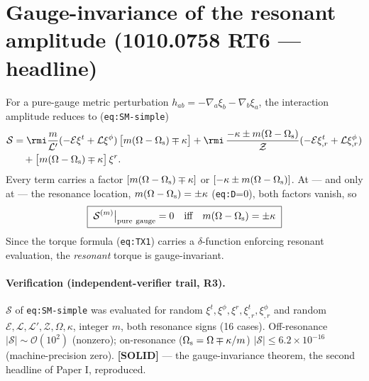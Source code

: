 \documentclass{article}
\begin{document}
\section*{Gauge-invariance of the resonant amplitude (1010.0758 RT6 — headline)}

For a pure-gauge metric perturbation $h_{ab}=-\nabla_a\xi_b-\nabla_b\xi_a$, the interaction amplitude reduces
to (\texttt{eq:SM-simple})
\begin{align}
  \mathcal{S} &= \rmi\frac{m}{\mathcal{L}'}(-\mathcal{E}\xi^t+\mathcal{L}\xi^\phi)\,
                 \bigl[m(\Omega-\Omega_{\rm s})\mp\kappa\bigr]
     + \rmi\,\frac{-\kappa\pm m(\Omega-\Omega_{\rm s})}{\mathcal{Z}}
                 (-\mathcal{E}\xi^t_{,r}+\mathcal{L}\xi^\phi_{,r}) \nonumber\\
     &\quad + \bigl[m(\Omega-\Omega_{\rm s})\mp\kappa\bigr]\,\xi^r .
\end{align}
Every term carries a factor $[m(\Omega-\Omega_{\rm s})\mp\kappa]$ or $[-\kappa\pm m(\Omega-\Omega_{\rm s})]$.
At — and only at — the resonance location, $m(\Omega-\Omega_{\rm s})=\pm\kappa$ (\texttt{eq:D}=0), both
factors vanish, so
\begin{equation}
  \boxed{\;\mathcal{S}^{(m)}\big|_{\rm pure\ gauge}=0 \quad\text{iff}\quad m(\Omega-\Omega_{\rm s})=\pm\kappa\;}
\end{equation}
Since the torque formula (\texttt{eq:TX1}) carries a $\delta$-function enforcing resonant evaluation, the
\emph{resonant} torque is gauge-invariant.

\paragraph{Verification (independent-verifier trail, R3).} $\mathcal{S}$ of \texttt{eq:SM-simple} was evaluated
for random $\xi^t,\xi^\phi,\xi^r,\xi^t_{,r},\xi^\phi_{,r}$ and random $\mathcal{E},\mathcal{L},\mathcal{L}',
\mathcal{Z},\Omega,\kappa$, integer $m$, both resonance signs (16 cases). Off-resonance $|\mathcal{S}|\sim
\mathcal{O}(10^2)$ (nonzero); on-resonance ($\Omega_{\rm s}=\Omega\mp\kappa/m$) $|\mathcal{S}|\le6.2\times
10^{-16}$ (machine-precision zero). \textbf{[SOLID]} — the gauge-invariance theorem, the second headline of
Paper I, reproduced.
\end{document}
